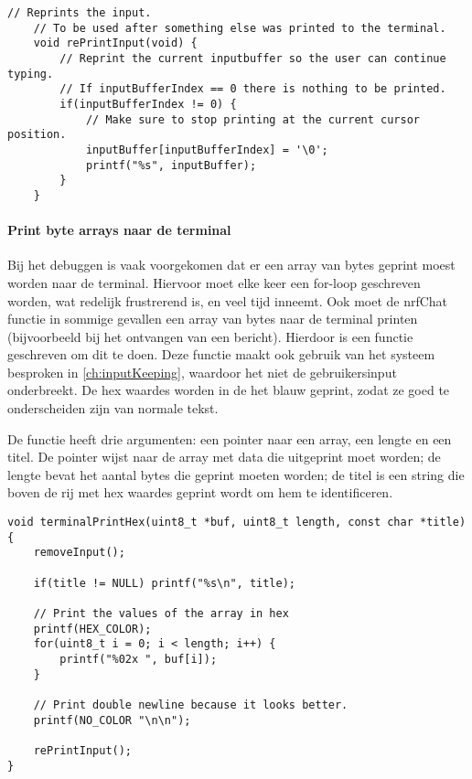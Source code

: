 \begin{lstlisting}[caption={De huidige input van de gebruiker opnieuw printen},captionpos=b,label={lst:reprintInput},style=c,xleftmargin=.\textwidth,xrightmargin=.\textwidth]
    // Reprints the input.
    // To be used after something else was printed to the terminal.
    void rePrintInput(void) {
        // Reprint the current inputbuffer so the user can continue typing.
        // If inputBufferIndex == 0 there is nothing to be printed.
        if(inputBufferIndex != 0) {
            // Make sure to stop printing at the current cursor position.
            inputBuffer[inputBufferIndex] = '\0';
            printf("%s", inputBuffer);
        }
    }
\end{lstlisting}

\paragraph{Print byte arrays naar de terminal}\label{ch:printStrex}
Bij het debuggen is vaak voorgekomen dat er een array van bytes geprint moest worden naar de terminal. Hiervoor moet elke keer een for-loop geschreven worden, wat redelijk frustrerend is, en veel tijd inneemt. Ook moet de nrfChat functie in sommige gevallen een array van bytes naar de terminal printen (bijvoorbeeld bij het ontvangen van een bericht). Hierdoor is een functie geschreven om dit te doen. Deze functie maakt ook gebruik van het systeem besproken in \autoref{ch:inputKeeping}, waardoor het niet de gebruikersinput onderbreekt. De hex waardes worden in de het blauw geprint, zodat ze goed te onderscheiden zijn van normale tekst.

De functie heeft drie argumenten: een pointer naar een array, een lengte en een titel. De pointer wijst naar de array met data die uitgeprint moet worden; de lengte bevat het aantal bytes die geprint moeten worden; de titel is een string die boven de rij met hex waardes geprint wordt om hem te identificeren.

\begin{lstlisting}[caption={Een hex string printen naar de terminal},captionpos=b,label={lst:terminalPrintHex},style=c,xleftmargin=.\textwidth,xrightmargin=.\textwidth]
void terminalPrintHex(uint8_t *buf, uint8_t length, const char *title) {
    removeInput();

    if(title != NULL) printf("%s\n", title);

    // Print the values of the array in hex
    printf(HEX_COLOR);
    for(uint8_t i = 0; i < length; i++) {
        printf("%02x ", buf[i]);
    }

    // Print double newline because it looks better.
    printf(NO_COLOR "\n\n");

    rePrintInput();
}
\end{lstlisting}

